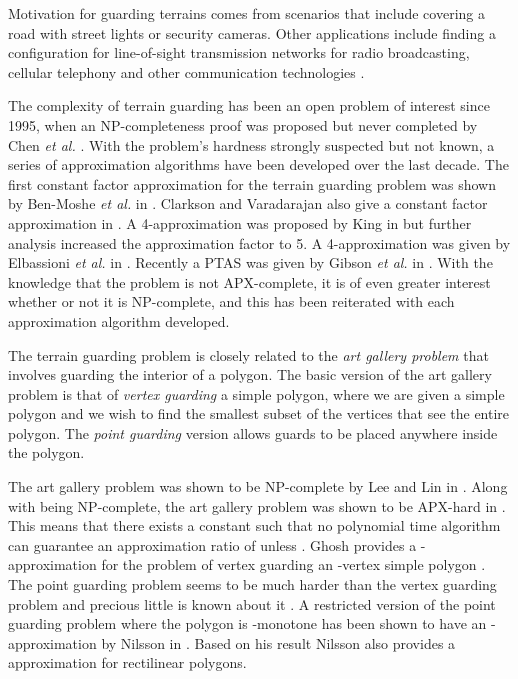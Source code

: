 \documentclass[11pt]{article}
\begin{document}
Motivation for guarding terrains comes from scenarios that include covering a road with street lights or security cameras.  Other applications include finding a configuration for line-of-sight transmission networks for radio broadcasting, cellular telephony and other communication technologies \cite{MKM05}.

The complexity of terrain guarding has been an open problem of interest since 1995, when an NP-completeness proof was proposed but never completed by Chen \textit{et al.} \cite{CEU96}.  With the problem's hardness strongly suspected but not known, a series of approximation algorithms have been developed over the last decade.
The first constant factor approximation for the terrain guarding problem was shown by Ben-Moshe \textit{et al.} in \cite{MKM05}.  Clarkson and Varadarajan also give a constant factor approximation in \cite{CV05}.  A 4-approximation was proposed by King in \cite{K06} but further analysis increased the approximation factor to 5.  A 4-approximation was given by Elbassioni \textit{et al.} in \cite{E09}.  Recently a PTAS was given by Gibson {\em et al.} in \cite{G09}.  With the knowledge that the problem is not APX-complete, it is of even greater interest whether or not it is NP-complete, and this has been reiterated with each approximation algorithm developed.

The terrain guarding problem is closely related to the \emph{art gallery problem} that involves guarding the interior of a polygon.  The basic version of
the art gallery problem is that of {\em vertex guarding} a simple polygon, where we are given a
simple polygon and we wish to find the smallest subset of the vertices that see the entire polygon.
The {\em point guarding} version allows guards to be placed anywhere inside the polygon.

The art gallery problem was shown to be NP-complete by Lee and Lin in \cite{LL86}.  Along with being NP-complete, the art gallery problem was shown to be APX-hard in \cite{E98}. This means that there exists a constant  such that no polynomial time algorithm can guarantee an approximation ratio of  unless .   Ghosh provides a -approximation for the problem of vertex guarding an -vertex simple polygon \cite{G88}.  The point guarding problem seems to be much harder than the vertex guarding problem and precious little is known about it \cite{DKDS07}.  A restricted version of the point guarding problem where the polygon is -monotone has been shown to have an -approximation by Nilsson in \cite{N05}.  Based on his result Nilsson also provides a  approximation for rectilinear polygons.
\end{document}
